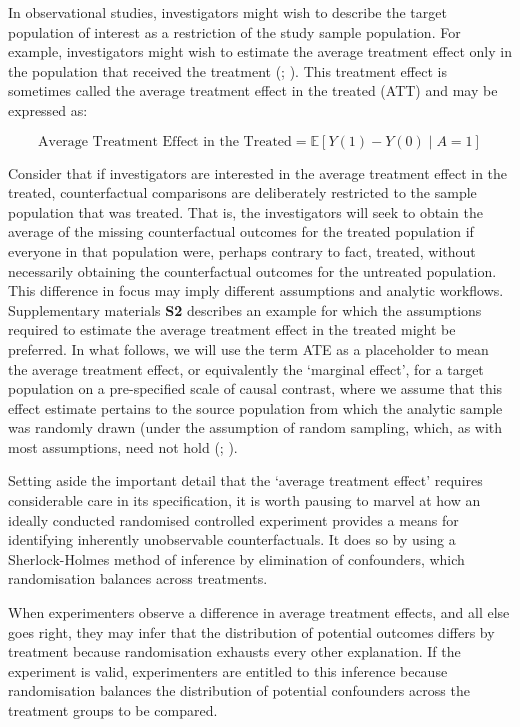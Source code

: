 \documentclass[
  single column]{article}
\begin{document}
In observational studies, investigators might wish to describe the
target population of interest as a restriction of the study sample
population. For example, investigators might wish to estimate the
average treatment effect only in the population that received the
treatment (;
). This treatment effect is
sometimes called the average treatment effect in the treated (ATT) and
may be expressed as:

\[
\text{Average Treatment Effect in the Treated} = \mathbb{E}[Y(1) - Y(0) \mid A = 1]
\]

Consider that if investigators are interested in the average treatment
effect in the treated, counterfactual comparisons are deliberately
restricted to the sample population that was treated. That is, the
investigators will seek to obtain the average of the missing
counterfactual outcomes for the treated population if everyone in that
population were, perhaps contrary to fact, treated, without necessarily
obtaining the counterfactual outcomes for the untreated population. This
difference in focus may imply different assumptions and analytic
workflows. Supplementary materials \textbf{S2} describes an example for
which the assumptions required to estimate the average treatment effect
in the treated might be preferred. In what follows, we will use the term
ATE as a placeholder to mean the average treatment effect, or
equivalently the `marginal effect', for a target population on a
pre-specified scale of causal contrast, where we assume that this effect
estimate pertains to the source population from which the analytic
sample was randomly drawn (under the assumption of random sampling,
which, as with most assumptions, need not hold
(;
).

Setting aside the important detail that the `average treatment effect'
requires considerable care in its specification, it is worth pausing to
marvel at how an ideally conducted randomised controlled experiment
provides a means for identifying inherently unobservable
counterfactuals. It does so by using a Sherlock-Holmes method of
inference by elimination of confounders, which randomisation balances
across treatments.

When experimenters observe a difference in average treatment effects,
and all else goes right, they may infer that the distribution of
potential outcomes differs by treatment because randomisation exhausts
every other explanation. If the experiment is valid, experimenters are
entitled to this inference because randomisation balances the
distribution of potential confounders across the treatment groups to be
compared.
\end{document}
